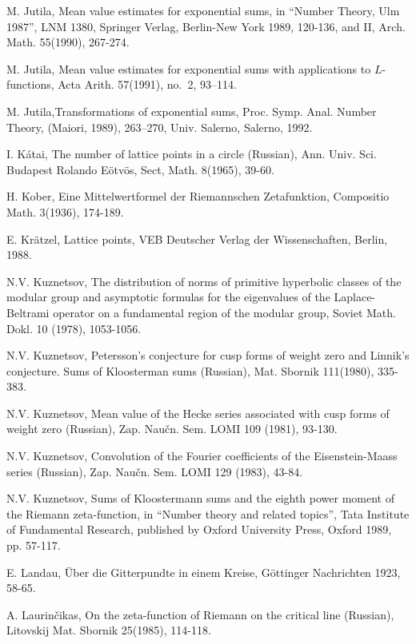 \begin{thebibliography}{99}
 M. Jutila, Mean value estimates for exponential sums, in ``Number Theory, Ulm 1987'', LNM 1380, Springer Verlag, Berlin-New York 1989, 120-136, and II, Arch. Math. 55(1990), 267-274.

 M. Jutila, Mean value estimates for exponential sums with applications to $L$-functions, Acta Arith. 57(1991), no.~2, 93--114.

 M. Jutila,\pageoriginale Transformations of exponential sums, Proc. Symp. Anal. Number Theory, (Maiori, 1989), 263--270, Univ. Salerno, Salerno, 1992.

 I. K\'atai, The number of lattice points in a circle (Russian), Ann. Univ. Sci. Budapest Rolando E\"otv\"os, Sect, Math. 8(1965), 39-60.

 H. Kober, Eine Mittelwertformel der Riemannschen Zetafunktion, Compositio Math. 3(1936), 174-189.

 E. Kr\"atzel, Lattice points, VEB Deutscher Verlag der Wissenschaften, Berlin, 1988.

 N.V. Kuznetsov, The distribution of norms of primitive hyperbolic classes of the modular group and asymptotic formulas for the eigenvalues of the Laplace-Beltrami operator on a fundamental region of the modular group, Soviet Math. Dokl. 10 (1978), 1053-1056.

 N.V. Kuznetsov, Petersson's conjecture for cusp forms of weight zero and Linnik's conjecture. Sums of Kloosterman sums (Russian), Mat. Sbornik 111(1980), 335-383.

 N.V. Kuznetsov, Mean value of the Hecke series associated with cusp forms of weight zero (Russian), Zap. Nau\v cn. Sem. LOMI 109 (1981), 93-130.

 N.V. Kuznetsov, Convolution of the Fourier coefficients of the Eisenstein-Maass series (Russian), Zap. Nau\v cn. Sem. LOMI 129 (1983), 43-84.

 N.V. Kuznetsov, Sums of Kloostermann sums and the eighth power moment of the Riemann zeta-function, in ``Number theory and related topics'', Tata Institute of Fundamental Research, published by Oxford University Press, Oxford 1989, pp. 57-117.

 E. Landau, \"Uber die Gitterpundte in einem Kreise, G\"ottinger Nachrichten 1923, 58-65.

 A. Laurin\v cikas, On the zeta-function of Riemann on the critical line (Russian), Litovskij Mat. Sbornik 25(1985), 114-118.


\end{thebibliography}
